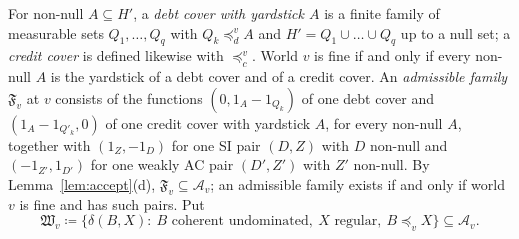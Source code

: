\documentclass[11pt]{article}
\theoremstyle{definition}\newtheorem{definition}[theorem]{Definition}
\theoremstyle{remark}\newtheorem{remark}[theorem]{Remark}
\begin{document}
For non-null $A\subseteq H'$, a \emph{debt cover with yardstick $A$} is a
finite family of measurable sets $Q_1,\dots,Q_q$ with $Q_k\preceq^v_dA$ and
$H'=Q_1\cup\dots\cup Q_q$ up to a null set; a \emph{credit cover} is defined
likewise with $\preceq^v_c$. World $v$ is fine if and only if every non-null
$A$ is the yardstick of a debt cover and of a credit cover. An
\emph{admissible family} $\mathfrak F_v$ at $v$ consists of the functions
$(0,1_A-1_{Q_k})$ of one debt cover and $(1_A-1_{Q'_k},0)$ of one credit
cover with yardstick $A$, for every non-null $A$, together with
$(1_Z,-1_D)$ for one SI pair $(D,Z)$ with $D$ non-null and
$(-1_{Z'},1_{D'})$ for one weakly AC pair $(D',Z')$ with $Z'$ non-null. By
Lemma~\ref{lem:accept}(d), $\mathfrak F_v\subseteq\mathcal A_v$; an
admissible family exists if and only if world $v$ is fine and has such
pairs. Put
\[
 \mathfrak W_v\coloneqq\{\delta(B,X):\ B\text{ coherent undominated},\
 X\text{ regular},\ B\preceq_vX\}\subseteq\mathcal A_v.
\]
\end{document}
